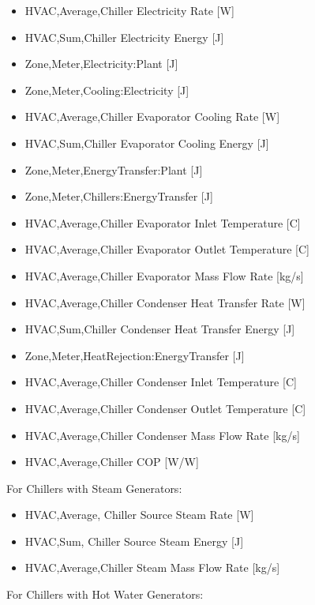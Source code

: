 \begin{itemize}
    \item
    HVAC,Average,Chiller Electricity Rate {[}W{]}
    \item
    HVAC,Sum,Chiller Electricity Energy {[}J{]}
    \item
    Zone,Meter,Electricity:Plant {[}J{]}
    \item
    Zone,Meter,Cooling:Electricity {[}J{]}
    \item
    HVAC,Average,Chiller Evaporator Cooling Rate {[}W{]}
    \item
    HVAC,Sum,Chiller Evaporator Cooling Energy {[}J{]}
    \item
    Zone,Meter,EnergyTransfer:Plant {[}J{]}
    \item
    Zone,Meter,Chillers:EnergyTransfer {[}J{]}
    \item
    HVAC,Average,Chiller Evaporator Inlet Temperature {[}C{]}
    \item
    HVAC,Average,Chiller Evaporator Outlet Temperature {[}C{]}
    \item
    HVAC,Average,Chiller Evaporator Mass Flow Rate {[}kg/s{]}
    \item
    HVAC,Average,Chiller Condenser Heat Transfer Rate {[}W{]}
    \item
    HVAC,Sum,Chiller Condenser Heat Transfer Energy {[}J{]}
    \item
    Zone,Meter,HeatRejection:EnergyTransfer {[}J{]}
    \item
    HVAC,Average,Chiller Condenser Inlet Temperature {[}C{]}
    \item
    HVAC,Average,Chiller Condenser Outlet Temperature {[}C{]}
    \item
    HVAC,Average,Chiller Condenser Mass Flow Rate {[}kg/s{]}
    \item
    HVAC,Average,Chiller COP {[}W/W{]}
\end{itemize}

For Chillers with Steam Generators:

\begin{itemize}
    \item
    HVAC,Average, Chiller Source Steam Rate {[}W{]}
    \item
    HVAC,Sum, Chiller Source Steam Energy {[}J{]}
    \item
    HVAC,Average,Chiller Steam Mass Flow Rate {[}kg/s{]}
\end{itemize}

For Chillers with Hot Water Generators:

